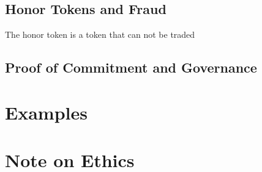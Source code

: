 \documentclass{article}
\begin{document}
\subsection{Honor Tokens and Fraud}
The honor token is a token that can not be traded

\subsection{Proof of Commitment and Governance}
\label{sec:governance}

\section{Examples}

\section{Note on Ethics}
\end{document}
